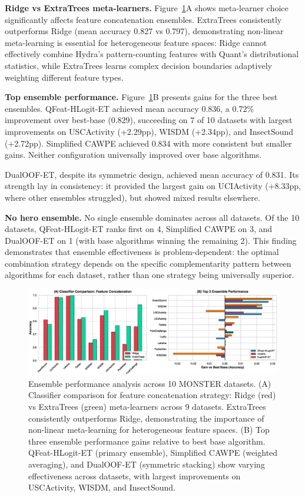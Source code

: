\documentclass[pdflatex,sn-basic]{sn-jnl}           %
\theoremstyle{thmstyleone}%
\theoremstyle{thmstyletwo}%
\theoremstyle{thmstylethree}%
\begin{document}


\textbf{Ridge vs ExtraTrees meta-learners.} Figure~\ref{fig:ensemble}A shows meta-learner choice significantly affects feature concatenation ensembles. ExtraTrees consistently outperforms Ridge (mean accuracy 0.827 vs 0.797), demonstrating non-linear meta-learning is essential for heterogeneous feature spaces: Ridge cannot effectively combine Hydra's pattern-counting features with Quant's distributional statistics, while ExtraTrees learns complex decision boundaries adaptively weighting different feature types.

\textbf{Top ensemble performance.} Figure~\ref{fig:ensemble}B presents gains for the three best ensembles. QFeat-HLogit-ET achieved mean accuracy 0.836, a 0.72\% improvement over best-base (0.829), succeeding on 7 of 10 datasets with largest improvements on USCActivity (+2.29pp), WISDM (+2.34pp), and InsectSound (+2.72pp). Simplified CAWPE achieved 0.834 with more consistent but smaller gains. Neither configuration universally improved over base algorithms.

DualOOF-ET, despite its symmetric design, achieved mean accuracy of 0.831. Its strength lay in consistency: it provided the largest gain on UCIActivity (+8.33pp, where other ensembles struggled), but showed mixed results elsewhere.

\textbf{No hero ensemble.} No single ensemble dominates across all datasets. Of the 10 datasets, QFeat-HLogit-ET ranks first on 4, Simplified CAWPE on 3, and DualOOF-ET on 1 (with base algorithms winning the remaining 2). This finding demonstrates that ensemble effectiveness is problem-dependent: the optimal combination strategy depends on the specific complementarity pattern between algorithms for each dataset, rather than one strategy being universally superior.

\begin{figure}[t]
\centering
\includegraphics[width=\textwidth]{figure2_ensemble_performance}
\caption{Ensemble performance analysis across 10 MONSTER datasets. (A) Classifier comparison for feature concatenation strategy: Ridge (red) vs ExtraTrees (green) meta-learners across 9 datasets. ExtraTrees consistently outperforms Ridge, demonstrating the importance of non-linear meta-learning for heterogeneous feature spaces. (B) Top three ensemble performance gains relative to best base algorithm. QFeat-HLogit-ET (primary ensemble), Simplified CAWPE (weighted averaging), and DualOOF-ET (symmetric stacking) show varying effectiveness across datasets, with largest improvements on USCActivity, WISDM, and InsectSound.}\label{fig:ensemble}
\end{figure}
\end{document}
